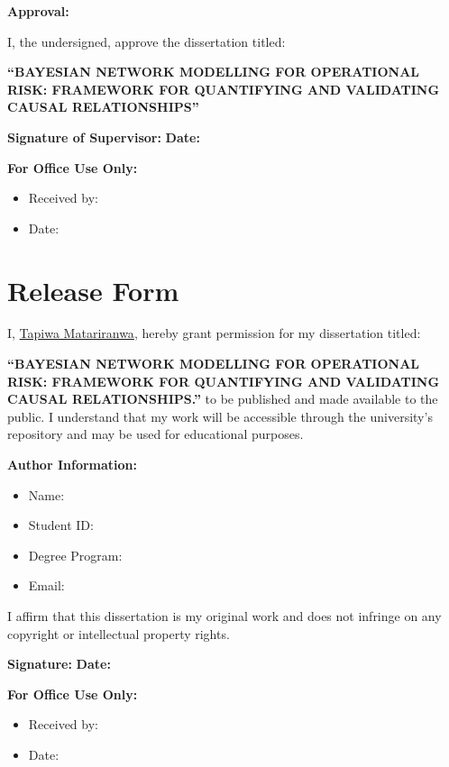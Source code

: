 \documentclass[12pt,a4paper]{extreport}
\begin{document}
\textbf{Approval:}

I, the undersigned, approve the dissertation titled:

\textbf{``BAYESIAN NETWORK MODELLING FOR OPERATIONAL RISK:
FRAMEWORK FOR QUANTIFYING AND VALIDATING
CAUSAL RELATIONSHIPS''}


\textbf{Signature of Supervisor:} \dotfill{} \hspace{3cm} \textbf{Date:} \dotfill{}



\textbf{For Office Use Only:}
\begin{itemize}
    \item Received by:  \dotfill{}
    \item Date: \dotfill{}
\end{itemize}

\newpage
\chapter*{Release Form}


I, \underline{Tapiwa Matariranwa}, hereby grant permission for my dissertation titled:

\textbf{``BAYESIAN NETWORK MODELLING FOR OPERATIONAL RISK: FRAMEWORK FOR
QUANTIFYING AND VALIDATING CAUSAL RELATIONSHIPS.''} to be published and made available to the public. I understand that my work will be accessible through the university's repository and may be used for educational purposes.


\textbf{Author Information:}
\begin{itemize}
    \item Name: \dotfill{}
    \item Student ID: \dotfill{}
    \item Degree Program:  \dotfill{}
    \item Email:  \dotfill{}
\end{itemize}


I affirm that this dissertation is my original work and does not infringe on any copyright or intellectual property rights.



\textbf{Signature:}  \dotfill{} \hspace{3cm} \textbf{Date:}  \dotfill{}


\textbf{For Office Use Only:}
\begin{itemize}
    \item Received by:  \dotfill{}
    \item Date:  \dotfill{}
\end{itemize}
\end{document}
